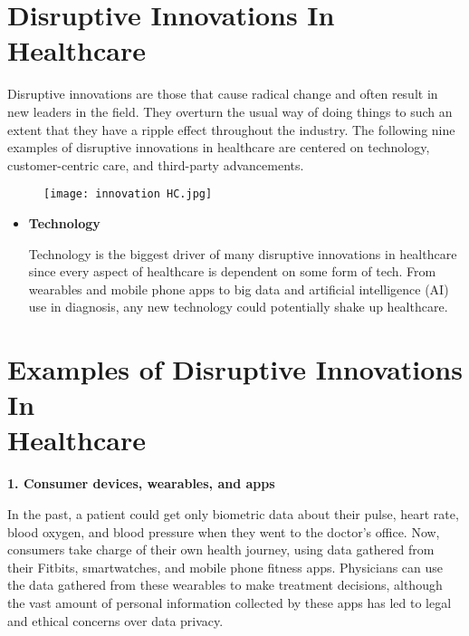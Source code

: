 \documentclass[12pt,a4paper]{article}
\begin{document}
\clearpage



\section{Disruptive Innovations In Healthcare}

 Disruptive innovations are those that cause radical change and often result in new leaders in the field. They overturn the usual way of doing things to such an extent that they have a ripple effect throughout the industry. The following nine examples of disruptive innovations in healthcare are centered on technology, customer-centric care, and third-party advancements.

\hspace{5cm}

\begin{figure}[h]
\centering
\texttt{[image: innovation HC.jpg]}
\end{figure}


\hspace{5cm}


\begin{itemize}
\item \textbf{Technology}

Technology is the biggest driver of many disruptive innovations in healthcare since every aspect of healthcare is dependent on some form of tech. From wearables and mobile phone apps to big data and artificial intelligence (AI) use in diagnosis, any new technology could potentially shake up healthcare.
\end{itemize}

\clearpage

\section{Examples of Disruptive Innovations In\\Healthcare}


\hspace{1cm}

\textbf {1. Consumer devices, wearables, and apps}

\hspace{1cm}
     
In the past, a patient could get only biometric data about their pulse, heart rate, blood oxygen, and blood pressure when they went to the doctor’s office. Now, consumers take charge of their own health journey, using data gathered from their Fitbits, smartwatches, and mobile phone fitness apps. Physicians can use the data gathered from these wearables to make treatment decisions, although the vast amount of personal information collected by these apps has led to legal and ethical concerns over data privacy.
\end{document}
